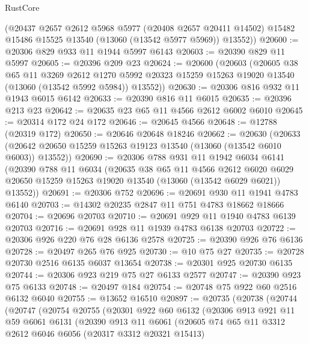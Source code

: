 \begin{lexlean}{RustCore}
\begin{coremodule}
      (@20437
        @2657
        @2612
        @5968
        @5977
        (@20408 @2657 @20411 @14502)
        @15482
        @15486
        @15525
        @13540
        (@13060 (@13542 @5977 @5969))
        @13552))
@20600 := @20306 @829 @933 @11 @1944 @5997 @6143
@20603 := @20390 @829 @11 @5997
@20605 := @20396 @209 @23
@20624 := @20600
    (@20603
      (@20605
        @38
        @65
        @11
        @3269
        @2612
        @1270
        @5992
        @20323
        @15259
        @15263
        @19020
        @13540
        (@13060 (@13542 @5992 @5984))
        @13552))
@20630 := @20306 @816 @932 @11 @1943 @6015 @6142
@20633 := @20390 @816 @11 @6015
@20635 := @20396 @213 @23
@20642 := @20635 @23 @65 @11 @4566 @2612 @6002 @6010
@20645 := @20314 @172 @24 @172
@20646 := @20645 @4566
@20648 := @12788 (@20319 @172)
@20650 := @20646 @20648 @18246
@20662 := @20630
    (@20633 (@20642 @20650 @15259 @15263 @19123 @13540 (@13060 (@13542 @6010 @6003)) @13552))
@20690 := @20306
    @788
    @931
    @11
    @1942
    @6034
    @6141
    (@20390
      @788
      @11
      @6034
      (@20635
        @38
        @65
        @11
        @4566
        @2612
        @6020
        @6029
        @20650
        @15259
        @15263
        @19020
        @13540
        (@13060 (@13542 @6029 @6021))
        @13552))
@20691 := @20306 @752
@20696 := @20691 @930 @11 @1941 @4783 @6140
@20703 := @14302 @20235 @2847 @11 @751 @4783 @18662 @18666
@20704 := @20696 @20703
@20710 := @20691 @929 @11 @1940 @4783 @6139 @20703
@20716 := @20691 @928 @11 @1939 @4783 @6138 @20703
@20722 := @20306 @926 @220 @76 @28 @6136 @2578
@20725 := @20390 @926 @76 @6136
@20728 := @20497 @265 @76 @925
@20730 := @10 @75 @27
@20735 := @20728 @20730 @2516 @6135 @6037 @13654
@20738 := @20301 @925 @20730 @6135
@20744 := @20306 @923 @219 @75 @27 @6133 @2577
@20747 := @20390 @923 @75 @6133
@20748 := @20497 @184
@20754 := @20748 @75 @922 @60 @2516 @6132 @6040
@20755 := @13652 @16510
@20897 := @20735
    (@20738
      (@20744
        (@20747
          (@20754
            @20755
            (@20301
              @922
              @60
              @6132
              (@20306
                @913
                @921
                @11
                @59
                @6061
                @6131
                (@20390
                  @913
                  @11
                  @6061
                  (@20605
                    @74
                    @65
                    @11
                    @3312
                    @2612
                    @6046
                    @6056
                    (@20317 @3312 @20321 @15413)

\end{coremodule}
\end{lexlean}
